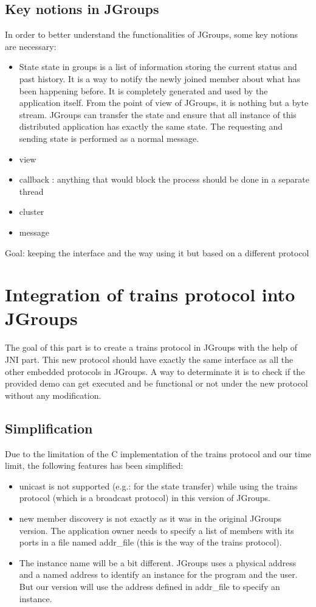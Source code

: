 \documentclass[a4paper,10pt]{report}
\begin{document}
\subsection{Key notions in JGroups}
In order to  better understand the functionalities of JGroups, some key notions are necessary:
\begin{itemize}
\item State state in groups is a list of information storing the current status and past history. 
It is a way to notify the newly joined member about what has been happening before.
It is completely generated and used by the application itself. 
From the point of view of JGroups, it is nothing but a byte stream. 
JGroups can transfer the state and ensure that all instance of this distributed application has exactly the same state. 
The requesting and sending state is performed as a normal message.
\item view
\item callback : anything that would block the process should be done in a separate thread
\item cluster
\item message
\end{itemize}
Goal: keeping the interface and the way using it but based on a different protocol 
\section{Integration of trains protocol into JGroups}
The goal of this part is to create a trains protocol in JGroups with the help of JNI part.
This new protocol should have exactly the same interface as all the other embedded protocols in JGroups.
A way to determinate it is to check if the provided demo can get executed and be functional or not under the new protocol without any modification.

\subsection{Simplification}
Due to the limitation of the C implementation of the trains protocol and our time limit, the following features has been simplified:
\begin{itemize}
\item unicast is not supported (e.g.: for the state transfer) while using the trains protocol (which is a broadcast protocol) in this version of JGroups.
\item new member discovery is not exactly as it was in the original JGroups version. The application owner needs to specify a list of members with its ports in a file named addr\_file (this is the way of the trains protocol).
\item The instance name will be a bit different. JGroups uses a physical address and a named address to identify an instance for the program and the user. But our version will use the address defined in addr\_file to specify an instance.
\end{itemize}
\end{document}
